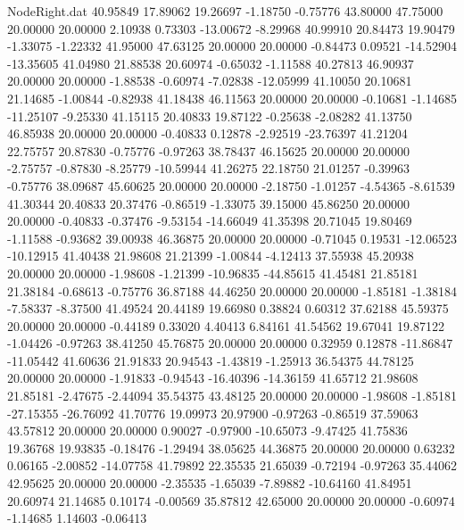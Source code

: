 \begin{filecontents}{NodeRight.dat}
  40.95849   17.89062   19.26697    -1.18750   -0.75776   43.80000   47.75000   20.00000   20.00000    2.10938    0.73303  -13.00672   -8.29968
  40.99910   20.84473   19.90479    -1.33075   -1.22332   41.95000   47.63125   20.00000   20.00000   -0.84473    0.09521  -14.52904  -13.35605
  41.04980   21.88538   20.60974    -0.65032   -1.11588   40.27813   46.90937   20.00000   20.00000   -1.88538   -0.60974   -7.02838  -12.05999
  41.10050   20.10681   21.14685    -1.00844   -0.82938   41.18438   46.11563   20.00000   20.00000   -0.10681   -1.14685  -11.25107   -9.25330
  41.15115   20.40833   19.87122    -0.25638   -2.08282   41.13750   46.85938   20.00000   20.00000   -0.40833    0.12878   -2.92519  -23.76397
  41.21204   22.75757   20.87830    -0.75776   -0.97263   38.78437   46.15625   20.00000   20.00000   -2.75757   -0.87830   -8.25779  -10.59944
  41.26275   22.18750   21.01257    -0.39963   -0.75776   38.09687   45.60625   20.00000   20.00000   -2.18750   -1.01257   -4.54365   -8.61539
  41.30344   20.40833   20.37476    -0.86519   -1.33075   39.15000   45.86250   20.00000   20.00000   -0.40833   -0.37476   -9.53154  -14.66049
  41.35398   20.71045   19.80469    -1.11588   -0.93682   39.00938   46.36875   20.00000   20.00000   -0.71045    0.19531  -12.06523  -10.12915
  41.40438   21.98608   21.21399    -1.00844   -4.12413   37.55938   45.20938   20.00000   20.00000   -1.98608   -1.21399  -10.96835  -44.85615
  41.45481   21.85181   21.38184    -0.68613   -0.75776   36.87188   44.46250   20.00000   20.00000   -1.85181   -1.38184   -7.58337   -8.37500
  41.49524   20.44189   19.66980     0.38824    0.60312   37.62188   45.59375   20.00000   20.00000   -0.44189    0.33020    4.40413    6.84161
  41.54562   19.67041   19.87122    -1.04426   -0.97263   38.41250   45.76875   20.00000   20.00000    0.32959    0.12878  -11.86847  -11.05442
  41.60636   21.91833   20.94543    -1.43819   -1.25913   36.54375   44.78125   20.00000   20.00000   -1.91833   -0.94543  -16.40396  -14.36159
  41.65712   21.98608   21.85181    -2.47675   -2.44094   35.54375   43.48125   20.00000   20.00000   -1.98608   -1.85181  -27.15355  -26.76092
  41.70776   19.09973   20.97900    -0.97263   -0.86519   37.59063   43.57812   20.00000   20.00000    0.90027   -0.97900  -10.65073   -9.47425
  41.75836   19.36768   19.93835    -0.18476   -1.29494   38.05625   44.36875   20.00000   20.00000    0.63232    0.06165   -2.00852  -14.07758
  41.79892   22.35535   21.65039    -0.72194   -0.97263   35.44062   42.95625   20.00000   20.00000   -2.35535   -1.65039   -7.89882  -10.64160
  41.84951   20.60974   21.14685     0.10174   -0.00569   35.87812   42.65000   20.00000   20.00000   -0.60974   -1.14685    1.14603   -0.06413

\end{filecontents}
